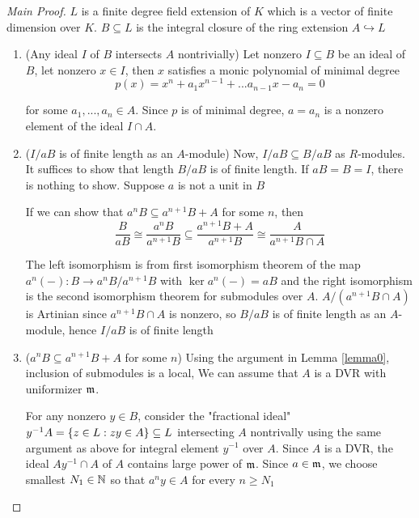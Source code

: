 \begin{proof}[Main Proof]
	
	$L$ is a finite degree field extension of $K$ which is a vector of finite dimension over $K$. $B \subseteq L$ is the integral closure of the ring extension $A \hookrightarrow L$
	
	\begin{center}
	\end{center}
	
	\begin{enumerate}
		\item (Any ideal $I$ of $B$ intersects $A$ nontrivially)
		Let nonzero $I \subseteq B$ be an ideal of $B$, let nonzero $x \in I$, then $x$ satisfies a monic polynomial of minimal degree
		$$
		p(x) = x^n + a_1 x^{n-1} + ... a_{n-1} x - a_n = 0
		$$
		
		for some $a_1, ..., a_n \in A$. Since $p$ is of minimal degree, $a = a_n$ is a nonzero element of the ideal $I \cap A$. 
		\item ($I / aB$ is of finite length as an $A$-module)
		Now, $I / aB \subseteq B / aB$ as $R$-modules. It suffices to show that length $B / aB$ is of finite length. If $aB = B = I$, there is nothing to show. Suppose $a$ is not a unit in $B$
		
		If we can show that $a^n B \subseteq a^{n+1} B + A$ for some $n$, then 
		$$
			\frac{B}{aB} \cong \frac{a^n B}{a^{n+1} B} \subseteq \frac{a^{n+1} B + A}{a^{n+1} B} \cong \frac{A}{a^{n+1} B \cap A}
		$$
		
		The left isomorphism is from first isomorphism theorem of the map $a^n(-): B \to a^n B / a^{n+1} B$ with $\ker a^n(-) = aB$ and the right isomorphism is the second isomorphism theorem for submodules over $A$. $A/(a^{n+1} B \cap A)$ is Artinian since $a^{n+1} B \cap A$ is nonzero, so $B / aB$ is of finite length as an $A$-module, hence $I / aB$ is of finite length
		
		\item ($a^n B \subseteq a^{n+1} B + A$ for some $n$) Using the argument in Lemma \ref{lemma0}, inclusion of submodules is a local, We can assume that $A$ is a DVR with uniformizer $\mathfrak{m}$.
		
		For any nonzero $y \in B$, consider the "fractional ideal" $y^{-1} A = \{z \in L: zy \in A\} \subseteq L$ intersecting $A$ nontrivally using the same argument as above for integral element $y^{-1}$ over $A$. Since $A$ is a DVR, the ideal $Ay^{-1} \cap A$ of $A$ contains large power of $\mathfrak{m}$. Since $a \in \mathfrak{m}$, we choose smallest $N_1 \in \mathbb{N}$ so that $a^n y \in A$ for every $n \geq N_1$
		

\end{enumerate}
\end{proof}
